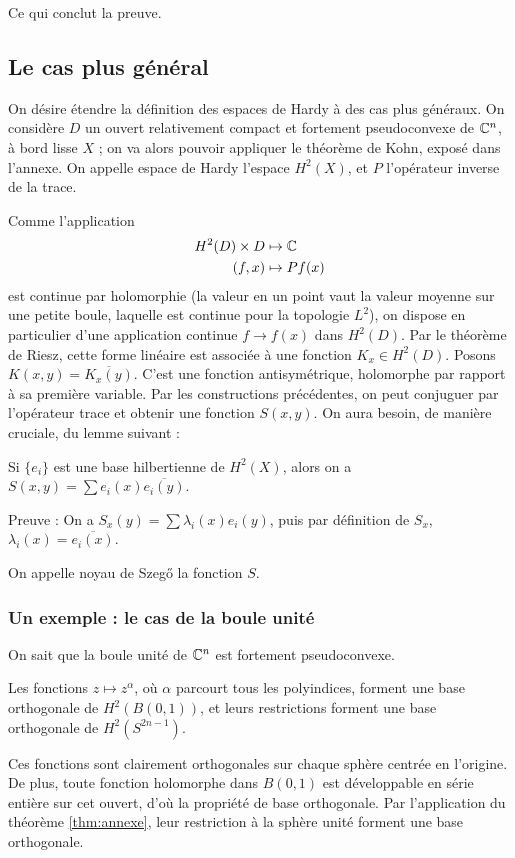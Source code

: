 Ce qui conclut la preuve.

\subsection{Le cas plus général}

On désire étendre la définition des espaces de Hardy à des cas plus généraux. On considère $D$ un ouvert relativement compact et fortement pseudoconvexe de $\mathbb{C}^n$, à bord lisse $X$ ; on va alors pouvoir appliquer le théorème de Kohn, exposé dans l'annexe. On appelle espace de Hardy l'espace $H^2(X)$, et $P$ l'opérateur inverse de la trace.

Comme l'application 
\begin{align*}
	H^2(D)\times D &\mapsto \mathbb{C}\\
	(f,x) &\mapsto Pf(x)
\end{align*} est continue par holomorphie (la valeur en un point vaut la valeur moyenne sur une petite boule, laquelle est continue pour la topologie $L^2$), on dispose en particulier d'une application continue $f \to f(x)$ dans $H^2(D)$. Par le théorème de Riesz, cette forme linéaire est associée à une fonction $K_x \in H^2(D)$. Posons $K(x,y) = \overline{K_x(y)}$. C'est une fonction antisymétrique, holomorphe par rapport à sa première variable. Par les constructions précédentes, on peut conjuguer par l'opérateur trace et obtenir une fonction $S(x,y)$. On aura besoin, de manière cruciale, du lemme suivant :

\begin{lem}
	Si $\{e_i\}$ est une base hilbertienne de $H^2(X)$, alors on a $S(x,y) = \sum e_i(x) \overline{e_i(y)}$.
\end{lem}

Preuve : On a $S_x(y) = \sum \lambda_i(x)e_i(y)$, puis par définition de $S_x$, $\lambda_i(x)= \overline{e_i(x)}$.

On appelle noyau de Szeg\H{o} la fonction $S$.

\subsubsection{Un exemple : le cas de la boule unité}
On sait que la boule unité de $\mathbb{C}^n$ est fortement pseudoconvexe. %

\begin{lem}
	Les fonctions $z \mapsto z^{\alpha}$, où $\alpha$ parcourt tous les polyindices, forment une base orthogonale de $H^2(B(0,1))$, et leurs restrictions forment une base orthogonale de $H^2(S^{2n-1})$.
\end{lem}
\begin{preuve}
	Ces fonctions sont clairement orthogonales sur chaque sphère centrée en l'origine. De plus, toute fonction holomorphe dans $B(0,1)$ est développable en série entière sur cet ouvert, d'où la propriété de base orthogonale. Par l'application du théorème \ref{thm:annexe}, leur restriction à la sphère unité forment une base orthogonale.
\end{preuve}

